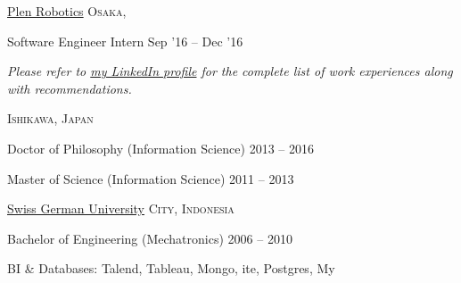 \documentclass[10pt,letterpaper]{article}
\begin{document}
\headedsection
{\href{http://www.plenrobotics.com/en/index.html}{Plen Robotics}}
{\textsc{Osaka, }} {

\headedsubsection
  {Software Engineer Intern}
  {Sep '16 -- Dec '16}
  {}
}

\vspace{-0.2em}
\begin{center}
\textit{Please refer to \href{http://linkedin.com/in/ferdipratama}{my LinkedIn profile} for the complete list of work experiences along with recommendations.}
\end{center}


\spacedhrule{-0.2em}{-0.4em}


\headedsection
{\href{https://www.jaist.ac.jp/english/}{}}
{\textsc{Ishikawa, Japan}} {

\headedsubsection
{Doctor of Philosophy \textnormal{(Information Science)}}
{2013 -- 2016}

\headedsubsection
{Master of Science \textnormal{(Information Science)}}
{2011 -- 2013} {}
}

\headedsection
{\href{https://www.sgu.ac.id/}{Swiss German University}}
{\textsc{ City, Indonesia}} {

\headedsubsection
{Bachelor of Engineering \textnormal{(Mechatronics)}}
{2006 -- 2010} {}
}

\spacedhrule{0.5em}{-0.4em}


\inlineheadsection %
  {BI \& Databases:}
  {Talend, Tableau, Mongo, ite, Postgres, My}
\vspace{0.5em}
\end{document}
